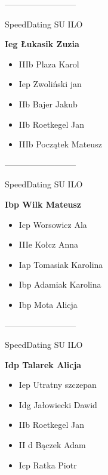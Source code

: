 \documentclass[a4paper,10pt]{article}
\begin{document}
\begin{multicols}{3}
\begin{minipage}[l]{\textwidth}
\end{minipage}



\begin{minipage}[l]{\textwidth}
--------------------------

  \footnotesize{SpeedDating SU ILO}

  \bfseries{Ieg Łukasik Zuzia}

  \begin{itemize}
    \item IIIb Plaza Karol
    \item Iep Zwoliński jan
    \item IIb Bajer Jakub
    \item IIb Roetkegel Jan
    \item IIIb Początek Mateusz

    \end{itemize}



\end{minipage}



\begin{minipage}[l]{\textwidth}
--------------------------

  \footnotesize{SpeedDating SU ILO}

  \bfseries{Ibp Wilk Mateusz}

  \begin{itemize}
    \item Icp Worsowicz Ala
    \item IIIe Kołcz Anna
    \item Iap Tomasiak Karolina
    \item Ibp Adamiak Karolina
    \item Ibp Mota Alicja

    \end{itemize}



\end{minipage}



\begin{minipage}[l]{\textwidth}
--------------------------

  \footnotesize{SpeedDating SU ILO}

  \bfseries{Idp Talarek Alicja}

  \begin{itemize}
    \item Iep Utratny szczepan
    \item Idg Jałowiecki Dawid
    \item IIb Roetkegel Jan
    \item II d Bączek Adam
    \item Icp Ratka Piotr


\end{itemize}
\end{minipage}
\end{multicols}
\end{document}

